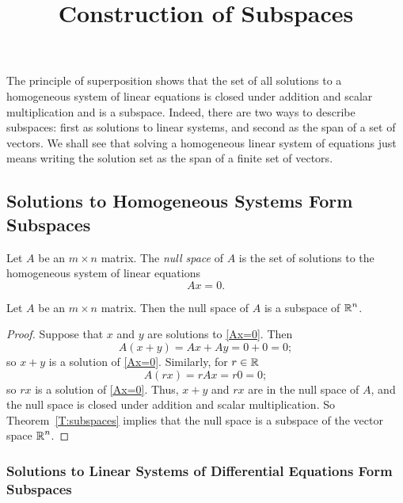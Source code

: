 \documentclass{ximera}
\title{Construction of Subspaces}
\begin{document}
\begin{abstract}
\end{abstract}
\maketitle

 \label{S:5.2}

The principle of superposition shows that the set of all
solutions to a homogeneous system of linear equations is closed under 
addition and scalar multiplication and is a
subspace.  Indeed, there are two ways to describe subspaces:
first as solutions to linear systems, and second as the span of
a set of vectors.  We shall see that solving a homogeneous linear system of
equations just means writing the solution set as the span of a
finite set of vectors.

\subsection*{Solutions to Homogeneous Systems Form Subspaces}
 

\begin{definition} \label{D:nullspace}
Let $A$ be an $m\times n$ matrix.  The {\em null space\/} of $A$
is the set of solutions to the homogeneous system of linear equations
\begin{equation} \label{Ax=0}
Ax=0.
\end{equation}
\end{definition} 

\begin{lemma}
Let $A$ be an $m\times n$ matrix.  Then the null space of $A$
is a subspace of $\mbox{$\Bbb{R}$}^n$.
\end{lemma}

\begin{proof}
Suppose that $x$ and $y$ are solutions to \eqref{Ax=0}.  Then
\[
A(x+y) = Ax+Ay = 0+0 = 0;
\]
so $x+y$ is a solution of \eqref{Ax=0}.  Similarly, for $r\in\mbox{$\Bbb{R}$}$
\[
A(rx) = rAx = r0 = 0;
\]
so $rx$ is a solution of \eqref{Ax=0}.  Thus, $x+y$ and $rx$ are
in the null space of $A$, and the null space is closed under addition 
and scalar multiplication.  So Theorem~\ref{T:subspaces} implies that
the null space is a subspace of the vector space $\mbox{$\Bbb{R}$}^n$.   \end{proof}

\subsubsection*{Solutions to Linear Systems of Differential Equations Form
Subspaces}
\end{document}

